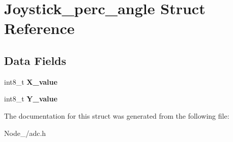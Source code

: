 \hypertarget{structJoystick__perc__angle}{}\section{Joystick\+\_\+perc\+\_\+angle Struct Reference}
\label{structJoystick__perc__angle}
\subsection*{Data Fields}
\begin{DoxyCompactItemize}
\item 
int8\+\_\+t {\bfseries X\+\_\+value}\hypertarget{structJoystick__perc__angle_acbb1265d9fe911531123c4622cb77178}{}\label{structJoystick__perc__angle_acbb1265d9fe911531123c4622cb77178}

\item 
int8\+\_\+t {\bfseries Y\+\_\+value}\hypertarget{structJoystick__perc__angle_a8896bd4dfc1314e3be0d2b8976fb4344}{}\label{structJoystick__perc__angle_a8896bd4dfc1314e3be0d2b8976fb4344}

\end{DoxyCompactItemize}


The documentation for this struct was generated from the following file\+:\begin{DoxyCompactItemize}
\item 
Node\+\_/adc.\+h\end{DoxyCompactItemize}
